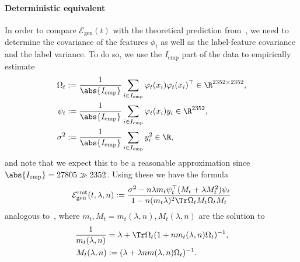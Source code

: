 \paragraph{Deterministic equivalent}
In order to compare $\mathcal E_\mathrm{gen}(t)$ with the theoretical prediction from~, we need to determine the covariance of the features $\phi_t$ as well as the label-feature covariance and the label variance. 
To do so, we use the $I_\mathrm{emp}$ part of the data to empirically estimate 
\begin{equation}
    \begin{aligned}
    \Omega_t&:=\frac{1}{\abs{I_\mathrm{emp}}}\sum_{i\in I_\mathrm{emp}} \varphi_t(x_i)\varphi_t(x_i)^\top\in\R^{2352\times2352}, \\
    \psi_t&:=\frac{1}{\abs{I_\mathrm{emp}}}\sum_{i\in I_\mathrm{emp}} \varphi_t(x_i)y_i\in\R^{2352}, \\
    \sigma^2&:= \frac{1}{\abs{I_\mathrm{emp}}}\sum_{i\in I_\mathrm{emp}} y_i^2\in \R,
    \end{aligned}
\end{equation}
and note that we expect this to be a reasonable approximation since $\abs{I_\mathrm{emp}}=27805\gg 2352$. Using these we have the formula 
    \begin{equation}\label{eq Egen rmt2}
            \mathcal E_\mathrm{gen}^\mathrm{rmt}(t,\lambda,n): = \frac{ \sigma^2 -  n\lambda m_t\psi_t^\top (M_t+\lambda M_t^2)\psi_t }{1-n(m_t\lambda)^2\Tr \Omega_t M_t\Omega_t M_t}
    \end{equation}
analogous to~, where $m_t,M_t=m_t(\lambda,n),M_t(\lambda,n)$ are the solution to 
\begin{equation}
    \begin{aligned}
    \frac{1}{m_t(\lambda,n)} &= \lambda + \Tr \Omega_t (1 + n m_t(\lambda,n)\Omega_t )^{-1}, \\
    M_t(\lambda,n) &:= (\lambda + \lambda n m(\lambda,n)\Omega_t )^{-1}.
    \end{aligned}
\end{equation}

